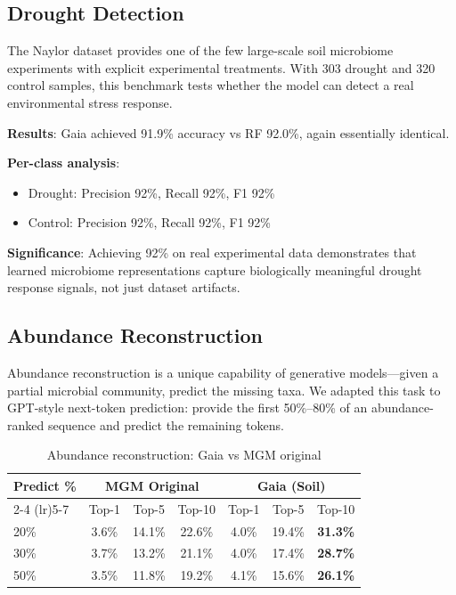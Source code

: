 \documentclass[11pt,a4paper]{article}
\begin{document}
\subsection{Drought Detection}

The Naylor dataset provides one of the few large-scale soil microbiome experiments with explicit experimental treatments. With 303 drought and 320 control samples, this benchmark tests whether the model can detect a real environmental stress response.

\textbf{Results}: Gaia achieved 91.9\% accuracy vs RF 92.0\%, again essentially identical.

\textbf{Per-class analysis}:
\begin{itemize}[leftmargin=1.5em]
    \item Drought: Precision 92\%, Recall 92\%, F1 92\%
    \item Control: Precision 92\%, Recall 92\%, F1 92\%
\end{itemize}

\textbf{Significance}: Achieving 92\% on real experimental data demonstrates that learned microbiome representations capture biologically meaningful drought response signals, not just dataset artifacts.

\subsection{Abundance Reconstruction}

Abundance reconstruction is a unique capability of generative models---given a partial microbial community, predict the missing taxa. We adapted this task to GPT-style next-token prediction: provide the first 50\%--80\% of an abundance-ranked sequence and predict the remaining tokens.

\begin{table}[H]
\centering
\caption{Abundance reconstruction: Gaia vs MGM original}
\label{tab:reconstruction}
\begin{tabular}{lcccccc}
\toprule
\multirow{2}{*}{\textbf{Predict \%}} & \multicolumn{3}{c}{\textbf{MGM Original}} & \multicolumn{3}{c}{\textbf{Gaia (Soil)}} \\
\cmidrule(lr){2-4} \cmidrule(lr){5-7}
 & Top-1 & Top-5 & Top-10 & Top-1 & Top-5 & Top-10 \\
\midrule
20\% & 3.6\% & 14.1\% & 22.6\% & 4.0\% & 19.4\% & \textbf{31.3\%} \\
30\% & 3.7\% & 13.2\% & 21.1\% & 4.0\% & 17.4\% & \textbf{28.7\%} \\
50\% & 3.5\% & 11.8\% & 19.2\% & 4.1\% & 15.6\% & \textbf{26.1\%} \\
\bottomrule
\end{tabular}
\end{table}
\end{document}
